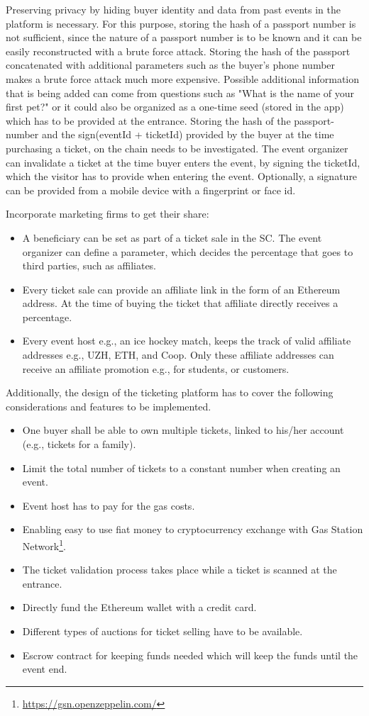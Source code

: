 Preserving privacy by hiding buyer identity and data from past events in the platform is necessary. For this purpose, storing the hash of a passport number is not sufficient, since the nature of a passport number is to be known and it can be easily reconstructed with a brute force attack. Storing the hash of the passport concatenated with additional parameters such as the buyer's phone number makes a brute force attack much more expensive. Possible additional information that is being added can come from questions such as "What is the name of your first pet?" or it could also be organized as a one-time seed (stored in the app) which has to be provided at the entrance. Storing the hash of the passport-number and the sign(eventId + ticketId) provided by the buyer at the time purchasing a ticket, on the chain needs to be investigated. The event organizer can invalidate a ticket at the time buyer enters the event, by signing the ticketId, which the visitor has to provide when entering the event. Optionally, a signature can be provided from a mobile device with a fingerprint or face id.

Incorporate marketing firms to get their share:
\begin{itemize}
    \item A beneficiary can be set as part of a ticket sale in the SC. The event organizer can define a parameter, which decides the percentage that goes to third parties, such as affiliates.
    \item Every ticket sale can provide an affiliate link in the form of an Ethereum address. At the time of buying the ticket that affiliate directly receives a percentage.
    \item Every event host e.g., an ice hockey match, keeps the track of valid affiliate addresses e.g., UZH, ETH, and Coop. Only these affiliate addresses can receive an affiliate promotion e.g., for students, or customers.
\end{itemize}

Additionally, the design of the ticketing platform has to cover the following considerations and features to be implemented.
\begin{itemize}
    \item One buyer shall be able to own multiple tickets, linked to his/her account (e.g., tickets for a family).
    \item Limit the total number of tickets to a constant number when creating an event.
    \item Event host has to pay for the gas costs.
    \item Enabling easy to use fiat money to cryptocurrency exchange with Gas Station Network\footnote{\url{https://gsn.openzeppelin.com/}}.
    \item The ticket validation process takes place while a ticket is scanned at the entrance.
    \item Directly fund the Ethereum wallet with a credit card.
    \item Different types of auctions for ticket selling have to be available.
    \item Escrow contract for keeping funds needed which will keep the funds until the event end.
\end{itemize}

